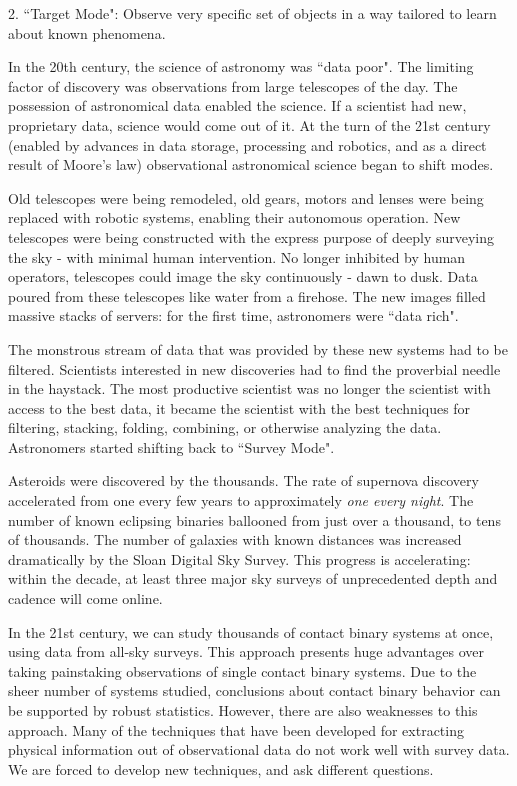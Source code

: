 \documentclass[12pt]{article} %
\numberwithin{equation}{section} %
\begin{document}
2. ``Target Mode": Observe very specific set of objects in a way tailored to learn about known phenomena.

In the 20th century, the science of astronomy was ``data poor". The limiting factor of discovery was observations from large telescopes of the day. The possession of astronomical data enabled the science. If a scientist had new, proprietary data, science would come out of it. At the turn of the 21st century (enabled by advances in data storage, processing and robotics, and as a direct result of Moore's law) observational astronomical science began to shift modes.

Old telescopes were being remodeled, old gears, motors and lenses were being replaced with robotic systems, enabling their autonomous operation. New telescopes were being constructed with the express purpose of deeply surveying the sky - with minimal human intervention. No longer inhibited by human operators, telescopes could image the sky continuously - dawn to dusk. Data poured from these telescopes like water from a firehose. The new images filled massive stacks of servers: for the first time, astronomers were ``data rich". 

The monstrous stream of data that was provided by these new systems had to be filtered. Scientists interested in new discoveries had to find the proverbial needle in the haystack. The most productive scientist was no longer the scientist with access to the best data, it became the scientist with the best techniques for filtering, stacking, folding, combining, or otherwise analyzing the data. Astronomers started shifting back to ``Survey Mode".

Asteroids were discovered by the thousands. The rate of supernova discovery accelerated from one every few years to approximately \emph{one every night}.  The number of known eclipsing binaries ballooned from just over a thousand, to tens of thousands. The number of galaxies with known distances was increased dramatically by the Sloan Digital Sky Survey. This progress is accelerating: within the decade, at least three major sky surveys of unprecedented depth and cadence will come online.

In the 21st century, we can study thousands of contact binary systems at once, using data from all-sky surveys. This approach presents huge advantages over taking painstaking observations of single contact binary systems. Due to the sheer number of systems studied, conclusions about contact binary behavior can be supported by robust statistics. However, there are also weaknesses to this approach. Many of the techniques that have been developed for extracting physical information out of observational data do not work well with survey data. We are forced to develop new techniques, and ask different questions.
\end{document}
